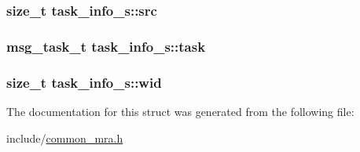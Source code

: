 \hypertarget{structtask__info__s_a80e71f08fc31bfe88a8c546f0e8155d7}{
\subsubsection[{src}]{\setlength{\rightskip}{0pt plus 5cm}size\-\_\-t {\bf task\-\_\-info\-\_\-s\-::src}}}\label{structtask__info__s_a80e71f08fc31bfe88a8c546f0e8155d7}
\hypertarget{structtask__info__s_a852100955a5ed323f31c670ef596787c}{
\subsubsection[{task}]{\setlength{\rightskip}{0pt plus 5cm}msg\-\_\-task\-\_\-t {\bf task\-\_\-info\-\_\-s\-::task}}}\label{structtask__info__s_a852100955a5ed323f31c670ef596787c}
\hypertarget{structtask__info__s_a7b70c65e767769e2a42e6c5978c2c669}{
\subsubsection[{wid}]{\setlength{\rightskip}{0pt plus 5cm}size\-\_\-t {\bf task\-\_\-info\-\_\-s\-::wid}}}\label{structtask__info__s_a7b70c65e767769e2a42e6c5978c2c669}


\-The documentation for this struct was generated from the following file\-:\begin{DoxyCompactItemize}
\item 
include/\hyperlink{common__mra_8h}{common\-\_\-mra.\-h}\end{DoxyCompactItemize}

